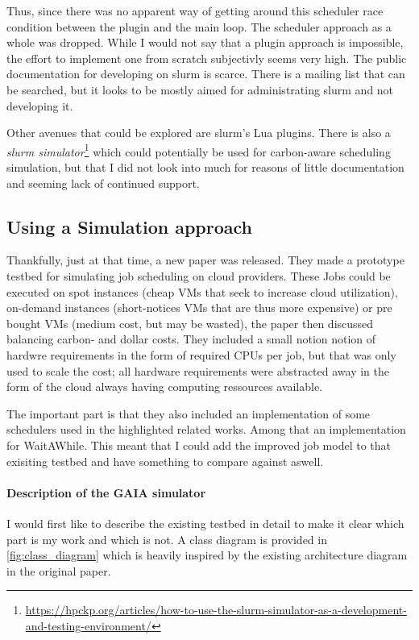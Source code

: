 Thus, since there was no apparent way of getting around this scheduler race condition between the plugin and the main loop. 
The scheduler approach as a whole was dropped. 
While I would not say that a plugin approach is impossible, the effort to implement one from scratch subjectivly seems very high. 
The public documentation for developing on slurm is scarce. 
There is a mailing list that can be searched, but it looks to be mostly aimed for administrating slurm and not developing it.

Other avenues that could be explored are slurm's Lua plugins. There is also a \emph{slurm simulator}\footnote{\url{https://hpckp.org/articles/how-to-use-the-slurm-simulator-as-a-development-and-testing-environment/}} which could potentially be used for carbon-aware scheduling simulation, but that I did not look into much for reasons of little documentation and seeming lack of continued support.

\subsection{Using a Simulation approach}

Thankfully, just at that time, a new paper \cite{hanafy_going_2024} was released. 
They made a prototype testbed for simulating job scheduling on cloud providers. These Jobs could be executed on spot instances (cheap VMs that seek to increase cloud utilization), on-demand instances (short-notices VMs that are thus more expensive) or pre bought VMs (medium cost, but may be wasted), the paper then discussed balancing carbon- and dollar costs. 
They included a small notion notion of hardwre requirements in the form of required CPUs per job, but that was only used to scale the cost; all hardware requirements were abstracted away in the form of the cloud always having computing ressources available.

The important part is that they also included an implementation of some schedulers used in the highlighted related works. Among that an implementation for WaitAWhile\cite{wiesner_lets_2021}.
This meant that I could add the improved job model to that exisiting testbed and have something to compare against aswell.

\paragraph{Description of the GAIA simulator}

I would first like to describe the existing testbed in detail to make it clear which part is my work and which is not. A class diagram is provided in \ref{fig:class_diagram} which is heavily inspired by the existing architecture diagram in the original paper. 

